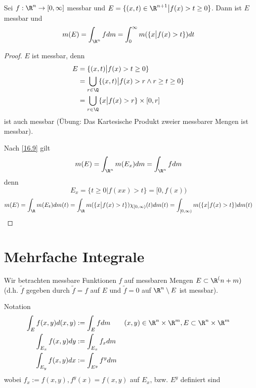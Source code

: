 \documentclass[a4paper,10pt]{scrbook}
\begin{document}
\begin{st}
	\label{16.11}
	Sei $f:\R^n\to [0,\infty]$ messbar und $E = \{(x,t)\in \R^{n+1} \big| f(x) > t \ge 0\}$.
	Dann ist $E$ messbar und
	\[
		m(E) = \int_{\R^n} f dm = \int_0^\infty m(\{x\big| f(x) > t\})dt
	\]
	\begin{proof}
		$E$ ist messbar, denn
		\begin{align*}
			E &= \{(x,t) \big| f(x) > t\ge 0\}\\
		   	&= \bigcup_{r\in \Q}\{(x,t)\big| f(x) > r\land r\ge t\ge 0\} \\
			&=\bigcup_{r\in \Q}\{x\big| f(x) > r\} \times [0,r]\\
		\end{align*}
		ist auch messbar (Übung: Das Kartesische Produkt zweier messbarer Mengen ist messbar).

		Nach \ref{16.9} gilt
		\[
			m(E) = \int_{\R^n}m(E_x) dm = \int_{\R^n}f dm
		\]
		denn
		\[
			E_x = \{t\ge 0\big| f(xx) > t\} = [0,f(x))
		\]
		\[
			m(E) = \int_\R m(E_t)dm(t) = \int_{\R}m(\{x\big|f(x)>t\})\chi_{[0,\infty)}(t) dm(t)
			= \int_{[0,\infty)} m(\{x\big|f(x)>t\})dm(t)
		\]
	\end{proof}
\end{st}


\section{Mehrfache Integrale}


Wir betrachten messbare Funktionen $f$ auf messbaren Mengen $E\subset \R^(n+m)$ (d.h. $\tilde f$ gegeben durch $\tilde f=f$ auf $E$ und $\tilde f=0$ auf $\R^n\setminus E$ ist messbar).

\begin{seg}{Notation}
	\begin{align*}
		\int_E f(x,y) d(x,y) &:= \int_E fdm \qquad (x,y)\in \R^n\times \R^m, E\subset \R^n\times \R^m\\
		\int_{E_x}f(x,y) dy &:= \int_{E_x}f_x dm\\
		\int_{E_y}f(x,y) dx &:= \int_{E^y}f^y dm
	\end{align*}
	wobei $f_x := f(x,y), f^y(x) = f(x,y)$ auf $E_x$, bzw. $E^y$ definiert sind
\end{seg}
\end{document}
